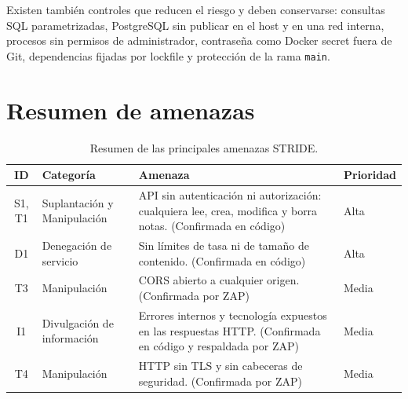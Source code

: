 Existen también controles que reducen el riesgo y deben conservarse:
consultas SQL parametrizadas, PostgreSQL sin publicar en el host y en una
red interna, procesos sin permisos de administrador, contraseña como Docker
secret fuera de Git, dependencias fijadas por lockfile y protección de la
rama \texttt{main}.

\section{Resumen de amenazas}

\begin{table}[H]
\centering
\caption{Resumen de las principales amenazas STRIDE.}
\label{tab:amenazas-principales}

\begin{tabularx}{\textwidth}{c l X l}
\toprule
\textbf{ID} &
\textbf{Categoría} &
\textbf{Amenaza} &
\textbf{Prioridad} \\
\midrule
S1, T1 & Suplantación y Manipulación &
API sin autenticación ni autorización: cualquiera lee, crea, modifica y
borra notas. (Confirmada en código) & Alta \\

D1 & Denegación de servicio &
Sin límites de tasa ni de tamaño de contenido. (Confirmada en código) &
Alta \\

T3 & Manipulación &
CORS abierto a cualquier origen. (Confirmada por ZAP) & Media \\

I1 & Divulgación de información &
Errores internos y tecnología expuestos en las respuestas HTTP.
(Confirmada en código y respaldada por ZAP) & Media \\

T4 & Manipulación &
HTTP sin TLS y sin cabeceras de seguridad. (Confirmada por ZAP) & Media \\
\bottomrule
\end{tabularx}
\end{table}
